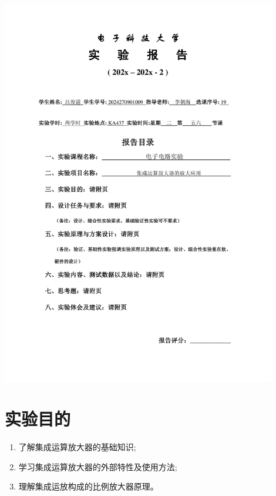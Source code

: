 \documentclass[10pt, a4paper]{article} %
\begin{document}
\begin{titlepage}
    \centering
    \includegraphics[page=1, width=0.9\textwidth, keepaspectratio]{image/实验报告撰写封面.pdf}
    \restoregeometry
\end{titlepage}

\setcounter{section}{2}

\section{实验目的}

\begin{enumerate}[leftmargin=50pt,label=(\arabic*)] %
    \item 了解集成运算放大器的基础知识; 
    \item 学习集成运算放大器的外部特性及使用方法; 
    \item 理解集成运放构成的比例放大器原理。
\end{enumerate}
\end{document}
